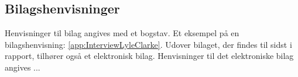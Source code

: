 \subsection*{Bilagshenvisninger}
Henvisninger til bilag angives med et bogstav. Et eksempel på en bilagshenvisning: \autoref{app:InterviewLyleClarke}. Udover bilaget, der findes til sidst i rapport, tilhører også et elektronisk bilag. Henvisninger til det elektroniske bilag angives ...
%
%
